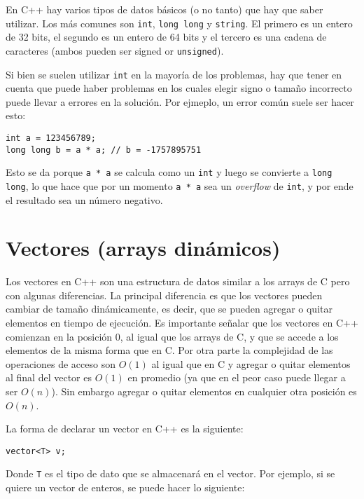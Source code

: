 En C++ hay varios tipos de datos básicos (o no tanto) que hay que saber utilizar. Los más comunes son \texttt{int},
\texttt{long long} y \texttt{string}. El primero es un entero de 32 bits, el segundo es un entero de 64 bits y el
tercero es una cadena de caracteres (ambos pueden ser signed or \texttt{unsigned}).

Si bien se suelen utilizar \texttt{int} en la mayoría de los problemas, hay que tener en cuenta que puede haber
problemas en los cuales elegir signo o tamaño incorrecto puede llevar a errores en la solución. Por ejmeplo, un error
común suele ser hacer esto:

\begin{lstlisting}
int a = 123456789;
long long b = a * a; // b = -1757895751
\end{lstlisting}

Esto se da porque \texttt{a * a} se calcula como un \texttt{int} y luego se convierte a \texttt{long long}, lo que hace
que por un momento \texttt{a * a} sea un \textit{overflow} de \texttt{int}, y por ende el resultado sea un número
negativo.


\section{Vectores (arrays dinámicos)}

Los vectores en C++ son una estructura de datos similar a los arrays de C pero con algunas diferencias. La principal
diferencia es que los vectores pueden cambiar de tamaño dinámicamente, es decir, que se pueden agregar o quitar
elementos en tiempo de ejecución. Es importante señalar que los vectores en C++ comienzan en la posición 0, al igual que
los arrays de C, y que se accede a los elementos de la misma forma que en C. Por otra parte la complejidad de las
operaciones de acceso son $O(1)$ al igual que en C y agregar o quitar elementos al final del vector es $O(1)$ en
promedio (ya que en el peor caso puede llegar a ser $O(n)$). Sin embargo agregar o quitar elementos en cualquier otra
posición es $O(n)$.

La forma de declarar un vector en C++ es la siguiente:

\begin{lstlisting}
vector<T> v;
\end{lstlisting}

Donde \texttt{T} es el tipo de dato que se almacenará en el vector. Por ejemplo, si se quiere un vector de enteros, se
puede hacer lo siguiente:

